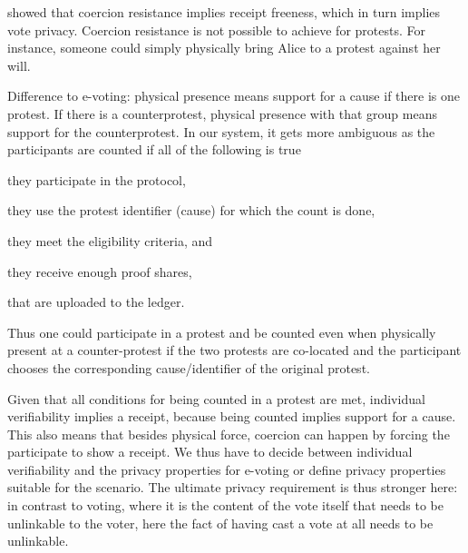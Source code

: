  showed that coercion resistance implies receipt freeness, which in turn implies vote privacy.
Coercion resistance is not possible to achieve for protests.
For instance, someone could simply physically bring Alice to a protest against her will.

Difference to e-voting:
physical presence means support for a cause if there is one protest. If there is a counterprotest, physical presence with that group means support for the counterprotest. In our system, it gets more ambiguous as the participants are counted if all of the following is true
\begin{enumerate*}
\item they participate in the protocol,
\item they use the protest identifier (cause) for which the count is done,
\item they meet the eligibility criteria, and
\item they receive enough proof shares,
\item that are uploaded to the ledger.
\end{enumerate*}
Thus one could participate in a protest and be counted even when physically 
present at a counter-protest if the two protests are co-located and the 
participant chooses the corresponding cause/identifier of the original protest.

Given that all conditions for being counted in a protest are met, individual verifiability implies a receipt, because being counted implies support for a cause. This also means that besides physical force, coercion can happen by forcing the participate to show a receipt. We thus have to decide between individual verifiability and the privacy properties for e-voting or define privacy properties suitable for the scenario. The ultimate privacy requirement is thus stronger here: in contrast to voting, where it is the content of the vote itself that needs to be unlinkable to the voter, here the fact of having cast a vote at all needs to be unlinkable.

